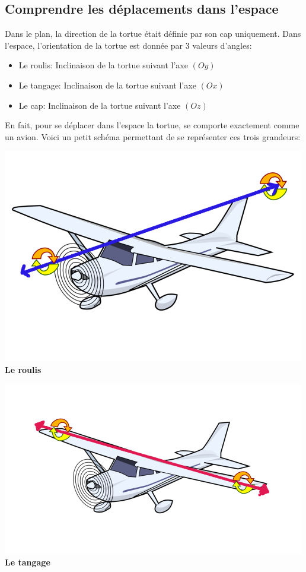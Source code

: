 \subsection{Comprendre les déplacements dans l'espace}
Dans le plan, la direction de la tortue était définie par son cap uniquement. Dans l'espace, l'orientation de la tortue est donnée par 3 valeurs d'angles:
\begin{itemize}
\item Le roulis: Inclinaison de la tortue suivant l'axe $(Oy)$
\item Le tangage: Inclinaison de la tortue suivant l'axe $(Ox)$
\item Le cap: Inclinaison de la tortue suivant l'axe $(Oz)$ 
\end{itemize}
En fait, pour se déplacer dans l'espace la tortue, se comporte exactement comme un avion. Voici un petit schéma permettant de se représenter ces trois grandeurs:\\
\begin{minipage}{5.8cm}
\begin{center}
\includegraphics*[scale=0.3]{images/plane-roll.png}
\textbf{Le roulis}
\end{center}
\end{minipage}
\begin{minipage}{5.5cm}
\begin{center}
\includegraphics*[scale=0.35]{images/plane-pitch.png}
\textbf{Le tangage}
\end{center}
\end{minipage}
